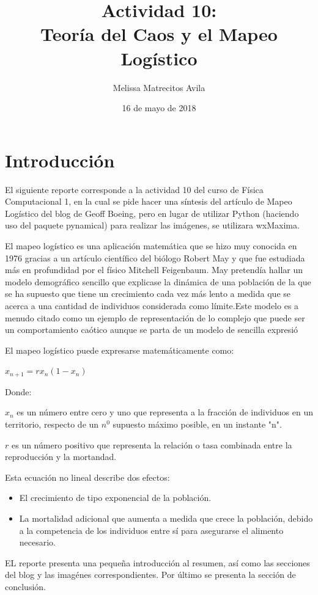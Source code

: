 \documentclass{article}
\title{Actividad 10: \\ Teoría del Caos y el Mapeo Logístico}
\author{Melissa Matrecitos Avila}
\date{16 de mayo de 2018}
\begin{document}
\maketitle

\section{Introducción}
El siguiente reporte corresponde a la actividad 10 del curso de Física Computacional 1, en la cual se pide hacer una síntesis del artículo de Mapeo Logístico del blog de Geoff Boeing, pero en lugar de utilizar Python (haciendo uso del paquete pynamical) para realizar las imágenes, se utilizara wxMaxima.

El mapeo logístico es una aplicación matemática que se hizo muy conocida en 1976 gracias a un artículo científico del biólogo Robert May y que fue estudiada más en profundidad por el físico Mitchell Feigenbaum. May pretendía hallar un modelo demográfico sencillo que explicase la dinámica de una población de la que se ha supuesto que tiene un crecimiento cada vez más lento a medida que se acerca a una cantidad de individuos considerada como límite.Este modelo es a menudo citado como un ejemplo de representación de lo complejo que puede ser un comportamiento caótico aunque se parta de un modelo de sencilla expresió

El mapeo logístico puede expresarse matemáticamente como:

\begin{center}
$x_{n+1}=rx_{n}(1-x_{n})$
\end{center}

Donde:

$ x_{n} $ es un número entre cero y uno que representa a la fracción de individuos en un territorio, respecto de un $n^0$ supuesto máximo posible, en un instante "n".

$r$ es un número positivo que representa la relación o tasa combinada entre la reproducción y la mortandad.

Esta ecuación no lineal describe dos efectos:
\begin{itemize}
\item El crecimiento de tipo exponencial de la población.
\item La mortalidad adicional que aumenta a medida que crece la población, debido a la competencia de los individuos entre sí para asegurarse el alimento necesario.
\end{itemize}

EL reporte presenta una pequeña introducción al resumen, así como las secciones del blog y las imagénes correspondientes. Por último se presenta la sección de conclusión.
\end{document}
